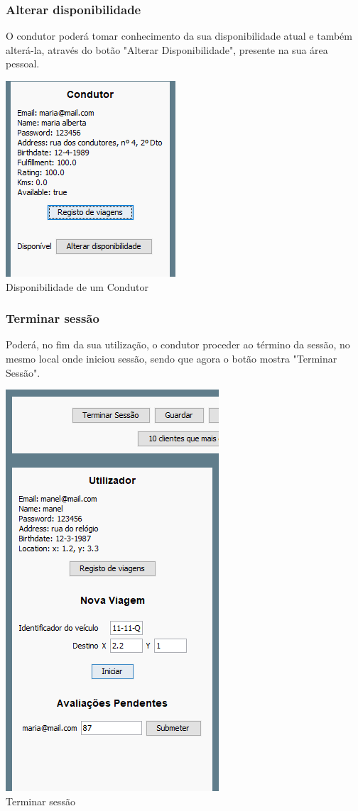 \documentclass[a4paper]{article}
\begin{document}
\subsubsection{Alterar disponibilidade}
O condutor poderá tomar conhecimento da sua disponibilidade atual e também alterá-la, através do botão "Alterar Disponibilidade", presente na sua área pessoal.
\begin{center}
  \includegraphics[scale=0.75]{condutor_disponibilidade}\\
  \caption{Disponibilidade de um Condutor}
  \label{fig:picture}
\end{center}
\subsubsection{Terminar sessão}
Poderá, no fim da sua utilização, o condutor proceder ao término da sessão, no mesmo local onde iniciou sessão, sendo que agora o botão mostra "Terminar Sessão".
\begin{center}
  \includegraphics[scale=0.75]{terminarsessao}\\
  \caption{Terminar sessão}
  \label{fig:picture}
\end{center}
\end{document}
